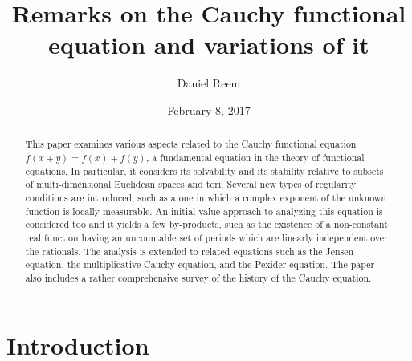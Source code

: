 \documentclass[12 pt]{amsart}
\title[Remarks on the Cauchy functional equation]{Remarks on the Cauchy functional equation and variations of it}
\author{Daniel Reem}
\date{February 8, 2017}
\theoremstyle{definition}
\begin{document}
\maketitle
\begin{abstract}
This paper examines various aspects related to the Cauchy functional equation $f(x+y)=f(x)+f(y)$, 
a fundamental equation in the theory of functional equations. In particular, it considers its  solvability and its stability relative to subsets of multi-dimensional Euclidean spaces and tori. 
Several new types  of regularity conditions are introduced, such as a one in which a complex  exponent of the  unknown function is locally measurable. An initial value approach to analyzing  this  equation is considered too and it yields a few by-products, such as the existence of a  non-constant real function having an uncountable set of periods which are linearly independent over the rationals. The analysis is extended to related equations such as the Jensen equation, the multiplicative Cauchy equation, and the Pexider equation. 
The paper also includes a rather comprehensive survey of the history of 
the Cauchy equation. 
\end{abstract}

\section{Introduction}\label{sec:Introduction}
\end{document}
